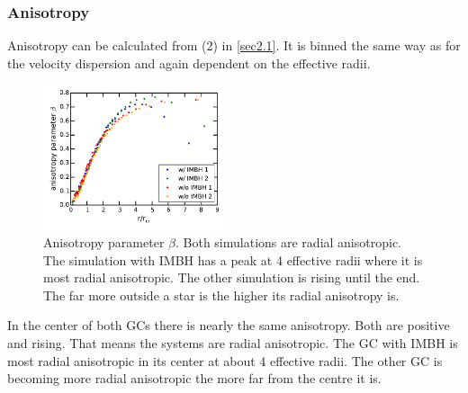 \subsubsection{Anisotropy}
Anisotropy can be calculated from (2) in \ref{sec2.1}. It is binned the same way as for the velocity dispersion and again dependent on the effective radii.
\begin{figure}
	\centering
	\includegraphics[width=0.475\textwidth]{Plots/anisotropy_parameter_beta.pdf}
	\caption{Anisotropy parameter \(\beta\). Both simulations are radial anisotropic. The simulation with \ac{IMBH} has a peak at 4 effective radii where it is most radial anisotropic. The other simulation is rising until the end. The far more outside a star is the higher its radial anisotropy is.}
	\label{fig:anisotropy_param}
\end{figure}
In the center of both \acp{GC} there is nearly the same anisotropy. Both are positive and rising. That means the systems are radial anisotropic. The \ac{GC} with \ac{IMBH} is most radial anisotropic in its center at about 4 effective radii. The other \ac{GC} is becoming more radial anisotropic the more far from the centre it is.

